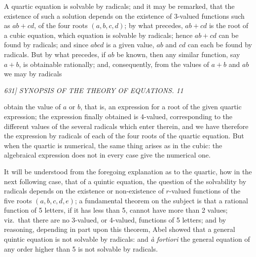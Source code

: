 \documentclass[12pt,a4paper]{article}
\begin{document}
A quartic equation is solvable by radicals; and it may be remarked, that the existence of such a solution depends on the existence of 3-valued functions such as $ab + cd$, of the four roots $(a, b, c, d)$; by what precedes, $ab + cd$ is the root of a cubic equation, which equation is solvable by radicals; hence $ab + cd$ can be found by radicals; and since $abcd$ is a given value, $ab$ and $cd$ can each be found by radicals. But by what precedes, if $ab$ be known, then any similar function, say $a + b$, is obtainable rationally; and, consequently, from the values of $a + b$ and $ab$ we may by radicals

\clearpage
\setcounter{page}{11}

\begin{center}
\textit{631] \hfill SYNOPSIS OF THE THEORY OF EQUATIONS. \hfill 11}
\end{center}

\noindent obtain the value of $a$ or $b$, that is, an expression for a root of the given quartic expression; the expression finally obtained is 4-valued, corresponding to the different values of the several radicals which enter therein, and we have therefore the expression by radicals of each of the four roots of the quartic equation. But when the quartic is numerical, the same thing arises as in the cubic: the algebraical expression does not in every case give the numerical one.

It will be understood from the foregoing explanation as to the quartic, how in the next following case, that of a quintic equation, the question of the solvability by radicals depends on the existence or non-existence of $r$-valued functions of the five roots $(a, b, c, d, e)$; a fundamental theorem on the subject is that a rational function of 5 letters, if it has less than 5, cannot have more than 2 values; viz.\ that there are no 3-valued, or 4-valued, functions of 5 letters; and by reasoning, depending in part upon this theorem, Abel showed that a general quintic equation is not solvable by radicals: and \textit{\`a fortiori} the general equation of any order higher than 5 is not solvable by radicals.
\end{document}

